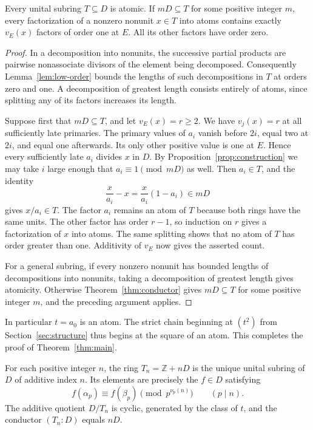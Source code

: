\begin{proposition}
    \label{prop:all-atomic}
    Every unital subring $T \subseteq D$ is atomic.
    If $mD \subseteq T$ for some positive integer $m$, every factorization of a nonzero nonunit $x \in T$ into atoms contains exactly $v_E(x)$ factors of order one at $E$.
    All its other factors have order zero.
\end{proposition}

\begin{proof}
    In a decomposition into nonunits, the successive partial products are pairwise nonassociate divisors of the element being decomposed.
    Consequently Lemma~\ref{lem:low-order} bounds the lengths of such decompositions in $T$ at orders zero and one.
    A decomposition of greatest length consists entirely of atoms, since splitting any of its factors increases its length.

    Suppose first that $mD \subseteq T$, and let $v_E(x) = r \ge 2$.
    We have $v_j(x) = r$ at all sufficiently late primaries.
    The primary values of $a_i$ vanish before $2i$, equal two at $2i$, and equal one afterwards.
    Its only other positive value is one at $E$.
    Hence every sufficiently late $a_i$ divides $x$ in $D$.
    By Proposition~\ref{prop:construction} we may take $i$ large enough that $a_i \equiv 1 \pmod{mD}$ as well.
    Then $a_i \in T$, and the identity
    \[
        \frac{x}{a_i} - x = \frac{x}{a_i}(1 - a_i) \in mD
    \]
    gives $x/a_i \in T$.
    The factor $a_i$ remains an atom of $T$ because both rings have the same units.
    The other factor has order $r - 1$, so induction on $r$ gives a factorization of $x$ into atoms.
    The same splitting shows that no atom of $T$ has order greater than one.
    Additivity of $v_E$ now gives the asserted count.

    For a general subring, if every nonzero nonunit has bounded lengths of decompositions into nonunits, taking a decomposition of greatest length gives atomicity.
    Otherwise Theorem~\ref{thm:conductor} gives $mD \subseteq T$ for some positive integer $m$, and the preceding argument applies.
\end{proof}

In particular $t = a_0$ is an atom.
The strict chain beginning at $(t^2)$ from Section~\ref{sec:structure} thus begins at the square of an atom.
This completes the proof of Theorem~\ref{thm:main}.

\begin{proposition}
    \label{prop:finite-index}
    For each positive integer $n$, the ring $T_n = \mathbb{Z} + nD$ is the unique unital subring of $D$ of additive index $n$.
    Its elements are precisely the $f \in D$ satisfying
    \[
        f(\alpha_p) \equiv f(\beta_p) \pmod{p^{\nu_p(n)}}
        \qquad (p \mid n).
    \]
    The additive quotient $D/T_n$ is cyclic, generated by the class of $t$, and the conductor $(T_n : D)$ equals $nD$.
\end{proposition}

